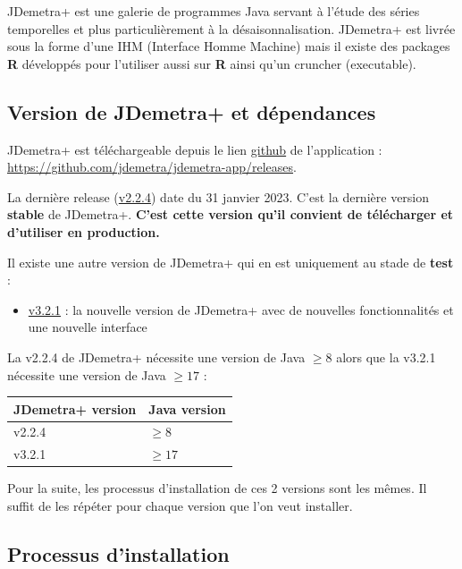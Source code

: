 \documentclass[
]{article}
\providecommand{\tightlist}{%
  \setlength{\itemsep}{0pt}\setlength{\parskip}{0pt}}
\begin{document}
JDemetra+ est une galerie de programmes Java servant à l'étude des
séries temporelles et plus particulièrement à la désaisonnalisation.
JDemetra+ est livrée sous la forme d'une IHM (Interface Homme Machine)
mais il existe des packages \textbf{R} développés pour l'utiliser aussi
sur \textbf{R} ainsi qu'un cruncher (executable).

\hypertarget{version-de-jdemetra-et-duxe9pendances}{%
\subsection{Version de JDemetra+ et
dépendances}\label{version-de-jdemetra-et-duxe9pendances}}

JDemetra+ est téléchargeable depuis le lien
\href{https://github.com/jdemetra/jdemetra-app/releases}{github} de
l'application :
\textcolor{html_color}{\url{https://github.com/jdemetra/jdemetra-app/releases}}.

La dernière release
(\href{https://github.com/jdemetra/jdemetra-app/releases/tag/v2.2.4}{v2.2.4})
date du 31 janvier 2023. C'est la dernière version \textbf{stable} de
JDemetra+. \textbf{C'est cette version qu'il convient de télécharger et
d'utiliser en production.}

Il existe une autre version de JDemetra+ qui en est uniquement au stade
de \textbf{test} :

\begin{itemize}
\tightlist
\item
  \href{https://github.com/jdemetra/jdplus-main/releases/tag/v3.2.1}{v3.2.1}
  : la nouvelle version de JDemetra+ avec de nouvelles fonctionnalités
  et une nouvelle interface
\end{itemize}

La v2.2.4 de JDemetra+ nécessite une version de Java \(\geq 8\) alors
que la v3.2.1 nécessite une version de Java \(\geq 17\) :

\begin{longtable}[]{@{}ll@{}}
\toprule()
JDemetra+ version & Java version \\
\midrule()
\endhead
v2.2.4 & \(\geq 8\) \\
v3.2.1 & \(\geq 17\) \\
\bottomrule()
\end{longtable}

Pour la suite, les processus d'installation de ces 2 versions sont les
mêmes. Il suffit de les répéter pour chaque version que l'on veut
installer.

\hypertarget{processus-dinstallation}{%
\subsection{Processus d'installation}\label{processus-dinstallation}}
\end{document}
